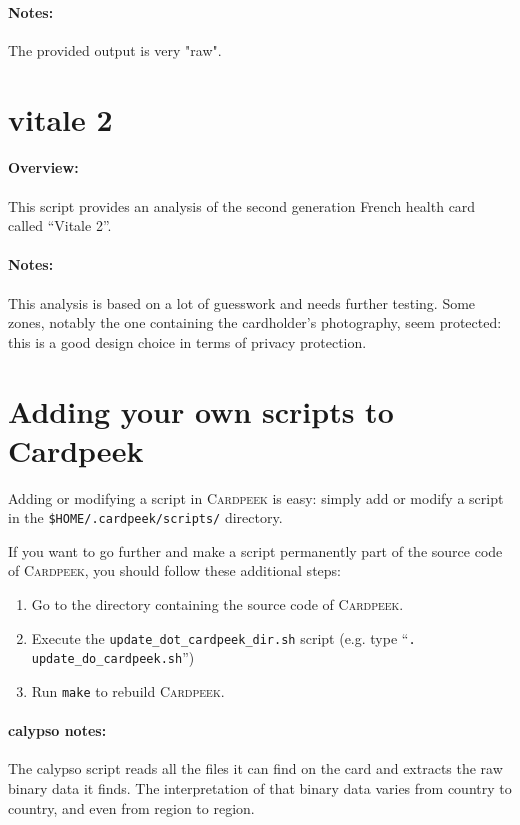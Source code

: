 \documentclass[11pt]{report}
\newcommand{\Cardpeek}{\textsc{Cardpeek}}
\begin{document}
\paragraph{Notes:}
The provided output is very "raw".

\section{vitale 2}

\paragraph{Overview:}
This script provides an analysis of the second generation French health card called ``Vitale 2''.

\paragraph{Notes:}
This analysis is based on a lot of guesswork and needs further testing.
Some zones, notably the one containing the cardholder's photography, seem protected: this is a good design choice in terms of privacy protection.

\section{Adding your own scripts to Cardpeek}
Adding or modifying a script in \Cardpeek{} is easy: simply add or modify a script in the \texttt{\$HOME/.cardpeek/scripts/} directory.

If you want to go further and make a script permanently part of the source code of \Cardpeek, you should follow these additional steps:
\begin{enumerate}
\item{Go to the directory containing the source code of \Cardpeek.}
\item{Execute the \texttt{update\_dot\_cardpeek\_dir.sh} script (e.g. type ``\texttt{. update\_do\_cardpeek.sh}'')}
\item{Run \texttt{make} to rebuild \Cardpeek.}
\end{enumerate}

\paragraph{calypso notes:}
The calypso script reads all the files it can find on the card and extracts the raw
binary data it finds. 
The interpretation of that binary data varies from country to country, and even from
region to region.
\end{document}
